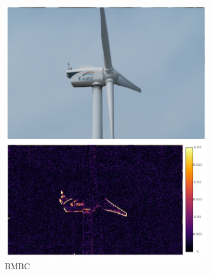 \documentclass{article}
\begin{document}
\begin{figure}
\begin{subfigure}{0.25\textwidth}
	\centering
    \includegraphics[width=1\linewidth]{qua_imgs/TEST02_045_f0465_bmbc.jpg}
    \caption{BMBC}
\end{subfigure}%
\begin{subfigure}{0.25\textwidth}
	\centering

\end{subfigure}
\end{figure}
\end{document}
